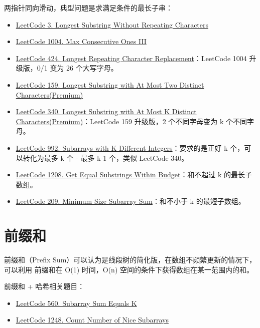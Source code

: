两指针同向滑动，典型问题是求满足条件的最长子串：
\begin{itemize}
  \item
    \href{https://leetcode.com/problems/longest-substring-without-repeating-characters/submissions/}{LeetCode
      3. Longest Substring Without Repeating Characters}
  \item
    \href{https://leetcode.com/problems/max-consecutive-ones-iii/}{LeetCode 1004. Max Consecutive Ones III}
  \item
    \href{https://leetcode.com/problems/longest-repeating-character-replacement/}{LeetCode
      424. Longest Repeating Character Replacement}：LeetCode 1004 升级版，0/1 变为 26 个大写字母。
  \item
    \href{https://leetcode.com/problems/longest-substring-with-at-most-two-distinct-characters}{LeetCode
      159. Longest Substring with At Most Two Distinct Characters(Premium)}
  \item
    \href{https://leetcode.com/problems/longest-substring-with-at-most-k-distinct-characters}{LeetCode
      340. Longest Substring with At Most K Distinct Characters(Premium)}：LeetCode 159
    升级版，2 个不同字母变为 k 个不同字母。
  \item
    \href{https://leetcode.com/problems/subarrays-with-k-different-integers}{LeetCode
    992. Subarrays with K Different Integers}：要求的是正好 k 个，可以转化为最多
  k 个 - 最多 k-1 个，类似 LeetCode 340。
  \item
    \href{https://leetcode.com/problems/get-equal-substrings-within-budget/}{LeetCode
      1208. Get Equal Substrings Within Budget}：和不超过 k 的最长子数组。
  \item
    \href{https://leetcode.com/problems/minimum-size-subarray-sum/}{LeetCode
      209. Minimum Size Subarray Sum}：和不小于 k 的最短子数组。
\end{itemize}

\section{前缀和}
前缀和（Prefix Sum）可以认为是线段树的简化版，在数组不频繁更新的情况下，可以利用
前缀和在 O(1) 时间，O(n) 空间的条件下获得数组在某一范围内的和。

前缀和 + 哈希相关题目：
\begin{itemize}
  \item
    \href{https://leetcode.com/problems/subarray-sum-equals-k/}{LeetCode 560. Subarray Sum Equals K}
  \item
    \href{https://leetcode.com/problems/count-number-of-nice-subarrays/}{LeetCode
      1248. Count Number of Nice Subarrays}
\end{itemize}

%

